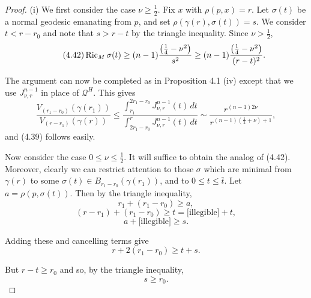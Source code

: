 \begin{proof}
(i) We first consider the case $\nu \geq \frac12$. Fix $x$ with
$\rho(p,x)=r$. Let $\sigma(t)$ be a normal geodesic emanating from $p$, and set
$\rho(\gamma(r),\sigma(t))=s$. We consider $t<r-r_0$ and note that $s>r-t$ by
the triangle inequality. Since $\nu > \frac12$,
\begin{equation}\tag{4.42}
\operatorname{Ric}_M\sigma(t) \geq (n-1)\frac{\left(\frac14-\nu^2\right)}{s^2} \geq
(n-1)\frac{\left(\frac14-\nu^2\right)}{(r-t)^2}.
\end{equation}

The argument can now be completed as in Proposition 4.1 (iv) except that we
use $J^{n-1}_{\nu,r}$ in place of $\mathscr{Q}^H$. This gives
\begin{equation}\tag{4.43}
\frac{V_{(r_1-r_0)}(\gamma(r_1))}{V_{(r-r_1)}(\gamma(r))}
\leq
\frac{\int_{r_1}^{2r_1-r_0} J^{n-1}_{\nu,r}(t)\,dt}{\int_{2r_1-r_0}^{r} J^{n-1}_{\nu,r}(t)\,dt}
\sim \frac{r^{(n-1)2\nu}}{r^{(n-1)(\frac12+\nu)+1}},
\end{equation}
and (4.39) follows easily.

Now consider the case $0 \leq \nu \leq \frac12$. It will suffice to obtain the
analog of (4.42). Moreover, clearly we can restrict attention to those $\sigma$
which are minimal from $\gamma(r)$ to some $\sigma(t) \in B_{r_1-r_0}(\gamma(r_1))$,
and to $0 \leq t \leq \bar t$. Let $a=\rho(p,\sigma(t))$. Then by the triangle
inequality,
\begin{equation}\tag{4.44}
r_1 + (r_1-r_0) \geq a,
\end{equation}
\begin{equation}\tag{4.45}
(r-r_1) + (r_1-r_0) \geq t = \text{[illegible]} + t,
\end{equation}
\begin{equation}\tag{4.46}
a + \text{[illegible]} \geq s.
\end{equation}

Adding these and cancelling terms give
\begin{equation}
r + 2(r_1 - r_0) \geq t + s.
\tag{4.47}
\end{equation}

But $r - t \geq r_0$ and so, by the triangle inequality,
\begin{equation}
s \geq r_0.
\tag{4.48}
\end{equation}


\end{proof}
